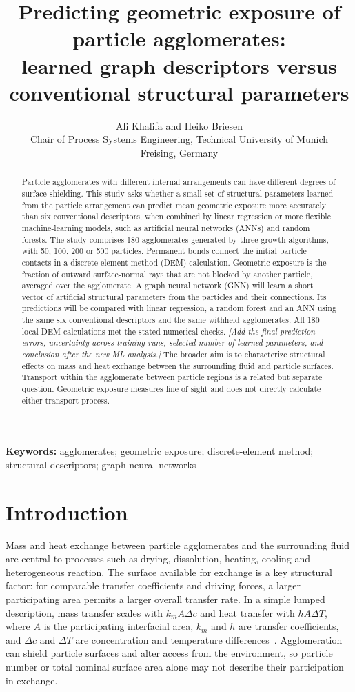 \documentclass[11pt,a4paper]{article}
\title{Predicting geometric exposure of particle agglomerates:\\learned graph descriptors versus conventional structural parameters}
\author{Ali Khalifa and Heiko Briesen\\\small Chair of Process Systems Engineering, Technical University of Munich\\\small Freising, Germany}
\date{}
\newcommand{\pending}[1]{{\color{red}\textit{[#1]}}}
\begin{document}
\maketitle
\doublespacing
\begin{abstract}
Particle agglomerates with different internal arrangements can have different degrees of surface shielding. This study asks whether a small set of structural parameters learned from the particle arrangement can predict mean geometric exposure more accurately than six conventional descriptors, when combined by linear regression or more flexible machine-learning models, such as artificial neural networks (ANNs) and random forests. The study comprises 180 agglomerates generated by three growth algorithms, with 50, 100, 200 or 500 particles. Permanent bonds connect the initial particle contacts in a discrete-element method (DEM) calculation. Geometric exposure is the fraction of outward surface-normal rays that are not blocked by another particle, averaged over the agglomerate. A graph neural network (GNN) will learn a short vector of artificial structural parameters from the particles and their connections. Its predictions will be compared with linear regression, a random forest and an ANN using the same six conventional descriptors and the same withheld agglomerates. All 180 local DEM calculations met the stated numerical checks. \pending{Add the final prediction errors, uncertainty across training runs, selected number of learned parameters, and conclusion after the new ML analysis.} The broader aim is to characterize structural effects on mass and heat exchange between the surrounding fluid and particle surfaces. Transport within the agglomerate between particle regions is a related but separate question. Geometric exposure measures line of sight and does not directly calculate either transport process.
\end{abstract}
\noindent\textbf{Keywords:} agglomerates; geometric exposure; discrete-element method; structural descriptors; graph neural networks

\section{Introduction}
Mass and heat exchange between particle agglomerates and the surrounding fluid are central to processes such as drying, dissolution, heating, cooling and heterogeneous reaction. The surface available for exchange is a key structural factor: for comparable transfer coefficients and driving forces, a larger participating area permits a larger overall transfer rate. In a simple lumped description, mass transfer scales with $k_m A\Delta c$ and heat transfer with $h A\Delta T$, where $A$ is the participating interfacial area, $k_m$ and $h$ are transfer coefficients, and $\Delta c$ and $\Delta T$ are concentration and temperature differences~\cite{Bird2002}. Agglomeration can shield particle surfaces and alter access from the environment, so particle number or total nominal surface area alone may not describe their participation in exchange.
\end{document}
